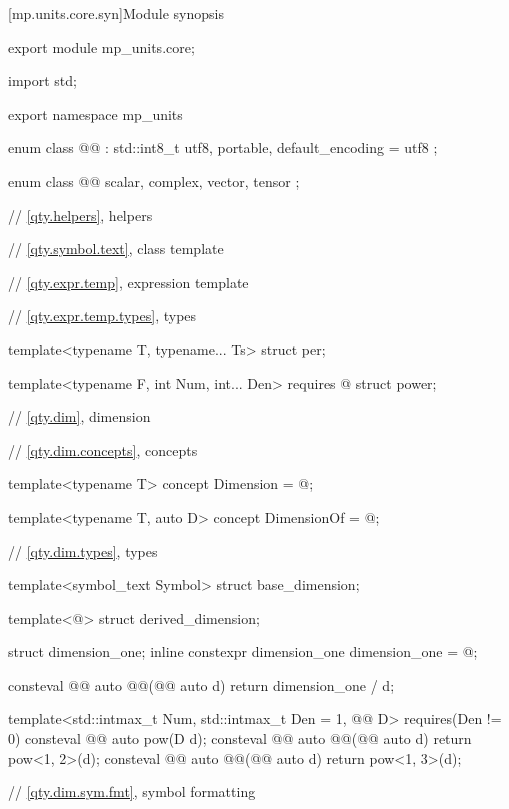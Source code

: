 [mp.units.core.syn]{Module  synopsis}
%
\begin{codeblock}
export module mp_units.core;

import std;

export namespace mp_units {

enum class @@ : std::int8_t { utf8, portable, default_encoding = utf8 };

enum class @@ { scalar, complex, vector, tensor };

// \ref{qty.helpers}, helpers

// \ref{qty.symbol.text}, class template 

// \ref{qty.expr.temp}, expression template

// \ref{qty.expr.temp.types}, types

template<typename T, typename... Ts>
struct per;

template<typename F, int Num, int... Den>
  requires @\seebelownc@
struct power;

// \ref{qty.dim}, dimension

// \ref{qty.dim.concepts}, concepts

template<typename T>
concept Dimension = @\seebelownc@;

template<typename T, auto D>
concept DimensionOf = @\seebelownc@;

// \ref{qty.dim.types}, types

template<symbol_text Symbol>
struct base_dimension;

template<@\seebelownc@>
struct derived_dimension;

struct dimension_one;
inline constexpr dimension_one dimension_one = @\seebelownc@;

consteval @@ auto @@(@@ auto d) { return dimension_one / d; }

template<std::intmax_t Num, std::intmax_t Den = 1, @@ D>
  requires(Den != 0)
consteval @@ auto pow(D d);
consteval @@ auto @@(@@ auto d) { return pow<1, 2>(d); }
consteval @@ auto @@(@@ auto d) { return pow<1, 3>(d); }

// \ref{qty.dim.sym.fmt}, symbol formatting

}
\end{codeblock}
